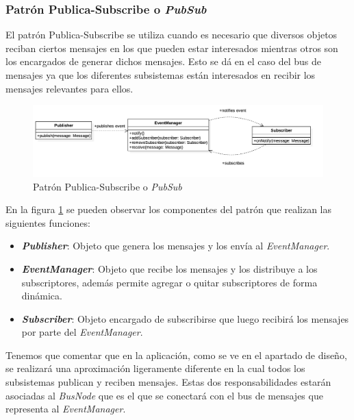 \subsubsection{Patrón Publica-Subscribe o \textit{PubSub}}

El patrón Publica-Subscribe se utiliza cuando es necesario que diversos objetos reciban ciertos mensajes en los que pueden estar interesados mientras otros son los encargados de generar dichos mensajes. Esto se dá en el caso del  bus de mensajes ya que los diferentes subsistemas están interesados en recibir los mensajes relevantes para ellos.

\bigskip

\begin{figure}
	\centerline{\includegraphics[width=18cm]{otros/UML/png/pubsub.png}}
	\caption{Patrón Publica-Subscribe o \textit{PubSub}}
		\label{pat:pubsub}
\end{figure}

\bigskip
 
En la figura \ref{pat:pubsub} se pueden observar los componentes del patrón que realizan las siguientes funciones:

\begin{itemize}
	\item \textbf{\textit{Publisher}}: Objeto que genera los mensajes y los envía al \textit{EventManager}.
	\item \textbf{\textit{EventManager}}: Objeto que recibe los mensajes y los distribuye a los subscriptores, además permite agregar o quitar subscriptores de forma dinámica.
	\item \textbf{\textit{Subscriber}}: Objeto encargado de subscribirse que luego recibirá los mensajes por parte del \textit{EventManager}.
\end{itemize}

\bigskip

Tenemos que comentar que en la aplicación, como se ve en el apartado de diseño, se realizará una aproximación ligeramente diferente en la cual todos los subsistemas publican y reciben mensajes. Estas dos responsabilidades estarán asociadas al \textit{BusNode} que es el que se conectará con el bus de mensajes que representa al \textit{EventManager}.



